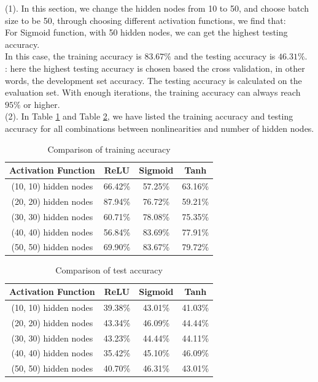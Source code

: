(1). In this section, we change the hidden nodes from 10 to 50, and choose batch size to be 50, through choosing different activation functions, we find that:\\

\indent For Sigmoid function, with 50 hidden nodes, we can get the highest testing accuracy.\\

\noindent In this case, the training accuracy is $83.67\%$ and the testing accuracy is $46.31\%$. \\

: here the highest testing accuracy is chosen based the cross validation, in other words, the development set accuracy. The testing accuracy is calculated on the evaluation set. With enough iterations, the training accuracy can always reach $95\%$ or higher.\\

(2). In Table \ref{table:trainAcc} and Table \ref{table:testAcc}, we have listed the training accuracy and testing accuracy for all combinations between nonlinearities and number of hidden nodes. 

\begin{table}[H]
	\centering
	\caption{Comparison of training accuracy}
	\label{table:trainAcc}	
	\begin{tabular}{c | c | c | c }
		\hline \hline
		Activation Function		&	ReLU	& 	Sigmoid		&	 Tanh 	\\[0.1cm]
		\hline
		(10, 10) hidden nodes	&	66.42\%	&	57.25\%		&	 63.16\% \\[0.1cm]
		(20, 20) hidden nodes	&	87.94\%	&	76.72\%		&	 59.21\% \\[0.1cm]
		(30, 30) hidden nodes	&	60.71\%	&	78.08\%		&	 75.35\% \\[0.1cm]
		(40, 40) hidden nodes	&	56.84\%	&	83.69\%		&	 77.91\% \\[0.1cm]
		(50, 50) hidden nodes	&	69.90\%	&	83.67\%		&	 79.72\% \\[0.1cm]
		\hline	
	\end{tabular}
\end{table}

\begin{table}[H]
	\centering
	\caption{Comparison of test accuracy}
	\label{table:testAcc}	
	\begin{tabular}{c | c | c | c }
		\hline \hline
		Activation Function		&	ReLU	& 	Sigmoid		&	 Tanh 	\\[0.1cm]
		\hline
		(10, 10) hidden nodes	&	39.38\%	&	43.01\%		&	 41.03\% \\[0.1cm]
		(20, 20) hidden nodes	&	43.34\%	&	46.09\%		&	 44.44\% \\[0.1cm]
		(30, 30) hidden nodes	&	43.23\%	&	44.44\%		&	 44.11\% \\[0.1cm]
		(40, 40) hidden nodes	&	35.42\%	&	45.10\%		&	 46.09\% \\[0.1cm]
		(50, 50) hidden nodes	&	40.70\%	&	46.31\%		&	 43.01\% \\[0.1cm]
		\hline	
	\end{tabular}
\end{table}

